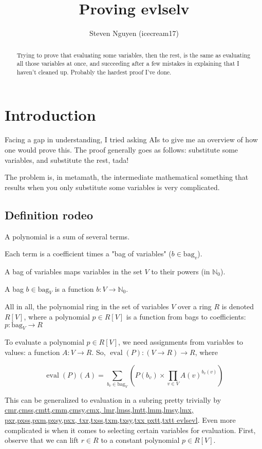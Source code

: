 \documentclass[]{article}
\title{Proving evlselv}
\author{Steven Nguyen (icecream17)}
\makeatletter
\DeclareMathOperator{\eval}{eval}
\newcommand{\bag}[1]{\mathrm{bag}_{#1}}
\newcommand{\theoremlink}[1]{\href{https://us.metamath.org/mpeuni/#1.html}{\midtilde{} #1}}
\newcommand\midtilde@raisedtilde[1][.5]{\raisebox{#1ex}{\texttildelow}}
\def\midtilde@normaltilde{\texttildelow}
\newcommand\midtilde%
{%
  \expandafter\in@\expandafter{\f@family}%
    {cmr,cmss,cmtt,cmm,cmsy,cmx,%
    lmr,lmss,lmtt,lmm,lmsy,lmx,%
    pxr,pxss,pxm,pxsy,pxx,%
    txr,txss,txm,txsy,txx}%
  \ifin@%
    \midtilde@raisedtilde%
  \else%
    \expandafter\in@\expandafter{\f@family}%
    {pxtt,txtt}%
    \ifin@%
      \midtilde@raisedtilde[.35]%
    \else%
      \midtilde@normaltilde%
    \fi%
  \fi%
}
\makeatother
\begin{document}
\maketitle

\begin{abstract}
Trying to prove that evaluating some variables, then the rest, is the same as evaluating all those variables at once, and succeeding after a few mistakes in explaining that I haven't cleaned up. Probably the hardest proof I've done.
\end{abstract}

\section{Introduction}

Facing a gap in understanding, I tried asking AIs to give me an overview of how one would prove this. The proof generally goes as follows: substitute some variables, and substitute the rest, tada!

The problem is, in metamath, the intermediate mathematical something that results when you only substitute some variables is very complicated.

\subsection{Definition rodeo}

A polynomial is a sum of several terms.

Each term is a coefficient times a "bag of variables" ($b \in \mathrm{bag}_v$).

A bag of variables maps variables in the set $V$ to their powers (in $\mathbb{N}_0$).

\indent{}\indent{}A bag $b \in \mathrm{bag}_V$ is a function $b: V \to \mathbb{N}_0$.

\noindent{}All in all, the polynomial ring in the set of variables $V$ over a ring $R$ is denoted $R[V]$, where a polynomial $p \in R[V]$ is a function from bags to coefficients: $p: \bag{V} \to R$

To evaluate a polynomial $p \in R[V]$, we need assignments from variables to values: a function $A: V \to R$. So, $\eval(P): (V \to R) \to R$, where

\[ \eval(P)(A) = \sum_{b_v \in \bag{V}}\left(P(b_v) \times \prod_{v \in V}{A(v)^{b_v(v)}}\right) \tag{ev}\label{ev} \]

This can be generalized to evaluation in a subring pretty trivially by \theoremlink{evlsevl}. Even more complicated is when it comes to selecting certain variables for evaluation. First, observe that we can lift $r \in R$ to a constant polynomial $p \in R[V]$.
\end{document}
